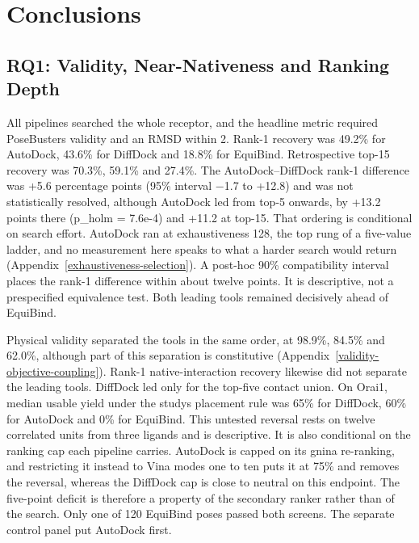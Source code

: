 \hypertarget{conclusions}{%
\chapter{\texorpdfstring{Conclusions }{Conclusions }}\label{conclusions}}

\hypertarget{rq1-quality-and-stability}{%
\section{RQ1: Validity, Near-Nativeness and Ranking Depth}\label{rq1-quality-and-stability}}

All pipelines searched the whole receptor, and the headline metric required PoseBusters validity and an RMSD within 2\angstrom{}. Rank-1 recovery was 49.2\% for AutoDock, 43.6\% for DiffDock and 18.8\% for EquiBind. Retrospective top-15 recovery was 70.3\%, 59.1\% and 27.4\%. The AutoDock--DiffDock rank-1 difference was +5.6 percentage points (95\% interval \ensuremath{-}1.7 to +12.8) and was not statistically resolved, although AutoDock led from top-5 onwards, by +13.2 points there (p\_holm = 7.6e-4) and +11.2 at top-15. That ordering is conditional on search effort. AutoDock ran at exhaustiveness 128, the top rung of a five-value ladder, and no measurement here speaks to what a harder search would return (Appendix~\ref{exhaustiveness-selection}). A post-hoc 90\% compatibility interval places the rank-1 difference within about twelve points. It is descriptive, not a prespecified equivalence test. Both leading tools remained decisively ahead of EquiBind.

Physical validity separated the tools in the same order, at 98.9\%, 84.5\% and 62.0\%, although part of this separation is constitutive (Appendix~\ref{validity-objective-coupling}). Rank-1 native-interaction recovery likewise did not separate the leading tools. DiffDock led only for the top-five contact union. On Orai1, median usable yield under the study\textquotesingle s placement rule was 65\% for DiffDock, 60\% for AutoDock and 0\% for EquiBind. This untested reversal rests on twelve correlated units from three ligands and is descriptive. It is also conditional on the ranking cap each pipeline carries. AutoDock is capped on its gnina re-ranking, and restricting it instead to Vina modes one to ten puts it at 75\% and removes the reversal, whereas the DiffDock cap is close to neutral on this endpoint. The five-point deficit is therefore a property of the secondary ranker rather than of the search. Only one of 120 EquiBind poses passed both screens. The separate control panel put AutoDock first.

